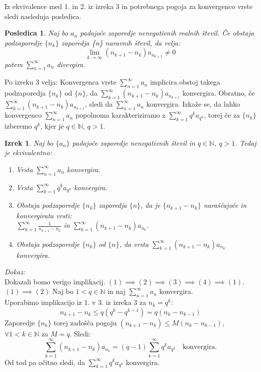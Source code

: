 \documentclass[a4paper,12pt]{article}
\def\N{\mathbb{N}} %
\newtheorem{izrek}{Izrek}
\newtheorem{posledica}{Posledica}
\begin{document}
Iz ekvivalence med 1. in 2. iz izreka 3 in potrebnega pogoja za konvergenco vrste sledi naslednja posledica.
\begin{posledica}
    Naj bo ${a_n}$ padajoče zaporedje nenegativnih realnih števil.
    Če obstaja podzaporedje $\{n_k\}$ zaporedja \{n\} naravnih števil, da velja:
    \[
        \lim_{k \to \infty} (n_{k+1} - n_k)a_{n_{k+1}} \neq 0 
    \] 
    potem $\sum_{n = 1}^{\infty}{a_n}$ divergira.
\end{posledica}

Po izreku 3 velja: 
Konvergenca vrste $\sum_{n = 1}^{\infty}{a_n}$ implicira obstoj takega
podzaporedja $\{n_k\}$ od $\{n\}$, da $\sum_{k = 1}^{\infty}{(n_{k+1} - n_k)a_{n_{k + 1}}}$ konvergira.
Obratno, če $\sum_{k = 1}^{\infty}{(n_{k+1} - n_k)a_{n_{k + 1}}}$, sledi da 
$\sum_{n = 1}^{\infty}{a_n}$ konvergira.
Izkaže se, da lahko konvergenco $\sum_{n = 1}^{\infty}{a_n}$ popolnoma karakteriziramo
z $\sum_{k = 1}^{\infty}{q^ka_{q^k}}$, torej če za $\{n_k\}$ izberemo ${q^k}$, kjer je $q \in \N$, $q > 1$.

\begin{izrek}
    Naj bo $\{a_n\}$ padajoče zaporedje nenegativnih števil in $ q \in {\mathbb{N}}$, $q > 1$. Tedaj je ekvivalentno:
    \begin{enumerate}
        \item Vrsta $\sum_{n = 1}^{\infty}{a_n}$ konvergira.
        \item Vrsta $\sum_{k = 1}^{\infty}{q^ka_{q^k}}$ konvergira.
        \item Obstaja podzaporedje $\{n_k\}$ zaporedja $\{n\}$, da je $\{n_{k+1} - n_k\}$ 
        naraščajoče in konvergirata vrsti:\\
        $\sum_{k = 1}^{\infty}{\frac{1}{n_{k+1} - n_k}}$ in 
        $\sum_{k = 1}^{\infty}{(n_{k+1} - n_k)a_{n_k}}$. 
        \item Obstaja podzaporedje $\{n_k\}$ od $\{n\}$, da vrsta $\sum_{k = 1}^{\infty}{(n_{k+1} - n_k)a_{n_k}}$ konvergira.
    \end{enumerate}
\end{izrek}   

\noindent
{\em Dokaz:\/} \\Dokazali bomo verigo implikacij. $ (1)\implies (2)\implies (3) \implies (4)\implies(1)$.
$(1) \implies (2)$ Naj bo $ 1 < q \in \N$ in naj $\sum_{n = 1}^{\infty}{a_n}$ konvergira.\\
    Uporabimo implikacijo iz 1. v 3. iz izreka 3 za $n_k = q^k$:\\
    \[
        n_{k+1} - n_k \leq q(q^k - q^{k-1}) = q(n_{k} - n_{k - 1})
    \]
    Zaporedje $\{n_k\}$ torej zadošča pogoju $(n_{k+1} - n_k) \leq M(n_k - n_{k - 1})$,
    $\forall 1 < k \in \N$ za $M = q$.
    Sledi:
    \[
        \sum_{k = 1}^{\infty}{(n_{k+1} - n_k)a_{n_k}} = (q-1)\sum_{k = 1}^{\infty}{q^ka_{q^k}} 
        \quad \text{konvergira.}
    \]
    Od tod pa očitno sledi, da $\sum_{k = 1}^{\infty}{q^ka_{q^k}}$ konvergira.
\end{document}
